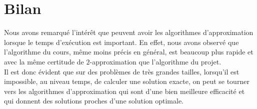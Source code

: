  \section{Bilan}
 Nous avons remarqué l'intérêt que peuvent avoir les algorithmes
 d'approximation lorsque le temps d'exécution est important. En effet,
 nous avons observé que l'algorithme du cours, même moins précis en
 général, est beaucoup plus rapide et avec la même certitude de
 $2$-approximation que l'algorithme du projet.\\

 Il est donc évident que sur des problèmes de très grandes tailles,
 lorsqu'il est impossible, au niveau temps, de calculer une solution
 exacte, on peut se tourner vers les algorithmes d'approximation qui
 sont d'une bien meilleure efficacité et qui donnent des solutions
 proches d'une solution optimale.